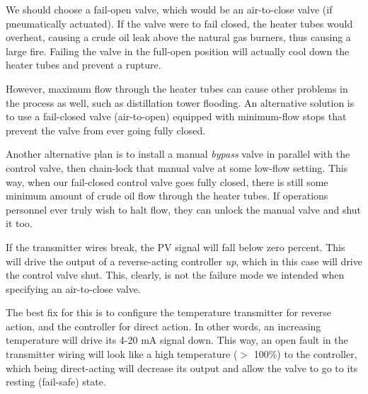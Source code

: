 





We should choose a fail-open valve, which would be an air-to-close valve (if pneumatically actuated). If the valve were to fail closed, the heater tubes would overheat, causing a crude oil leak above the natural gas burners, thus causing a large fire.  Failing the valve in the full-open position will actually cool down the heater tubes and prevent a rupture.

However, maximum flow through the heater tubes can cause other problems in the process as well, such as distillation tower flooding.  An alternative solution is to use a fail-closed valve (air-to-open) equipped with minimum-flow stops that prevent the valve from ever going fully closed.

Another alternative plan is to install a manual {\it bypass} valve in parallel with the control valve, then chain-lock that manual valve at some low-flow setting.  This way, when our fail-closed control valve goes fully closed, there is still some minimum amount of crude oil flow through the heater tubes.  If operations personnel ever truly wish to halt flow, they can unlock the manual valve and shut it too.

\vskip 10pt

If the transmitter wires break, the PV signal will fall below zero percent.  This will drive the output of a reverse-acting controller {\it up}, which in this case will drive the control valve shut.  This, clearly, is not the failure mode we intended when specifying an air-to-close valve.

The best fix for this is to configure the temperature transmitter for reverse action, and the controller for direct action.  In other words, an increasing temperature will drive its 4-20 mA signal down.  This way, an open fault in the transmitter wiring will look like a high temperature ($>$ 100\%) to the controller, which being direct-acting will decrease its output and allow the valve to go to its resting (fail-safe) state.











